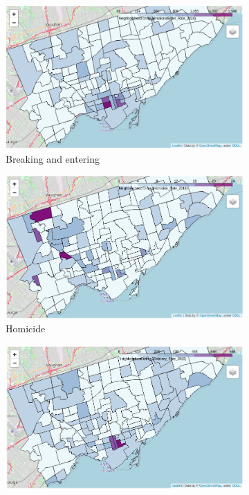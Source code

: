 \documentclass{article}
\begin{document}
\begin{figure}[ht]
     \begin{subfigure}[b]{0.47\textwidth}
         \centering
         \includegraphics[width=\textwidth]{pics/breakenter}
         \caption{Breaking and entering}
     \end{subfigure}
     \hfill
     \begin{subfigure}[b]{0.47\textwidth}
         \centering
         \includegraphics[width=\textwidth]{pics/homicide}
         \caption{Homicide}
     \end{subfigure}
     \begin{subfigure}[b]{0.47\textwidth}
         \centering
         \includegraphics[width=\textwidth]{pics/robbery}

\end{subfigure}
\end{figure}
\end{document}

